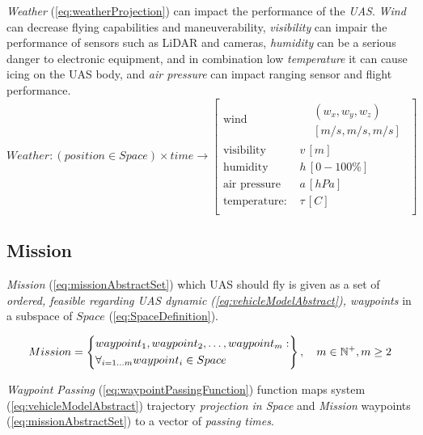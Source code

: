     \noindent\emph{Weather} (\ref{eq:weatherProjection}) can impact the performance of the \emph{UAS}. \emph{Wind} can decrease flying capabilities and maneuverability, \emph{visibility} can impair the performance of sensors such as LiDAR and cameras, \emph{humidity} can be a serious danger to electronic equipment, and in combination low \emph{temperature} it can cause icing on the UAS body, and \emph{air pressure} can impact ranging sensor and flight performance. 
    \begin{equation}\label{eq:weatherProjection}
        Weather:\left(position\in Space\right) \times time \to
        \left[
        \begin{aligned}
            \text{wind } & \begin{aligned}&(w_x,w_y,w_z)\\&[m/s,m/s,m/s]\end{aligned}\\
            \text{visibility }& v\,[m]\\
            \text{humidity }& h\,[0-100 \%] \\
            \text{air pressure }& a\,[hPa]\\
            \text{temperature: }& \tau\,[C]\\
        \end{aligned}
        \right]
    \end{equation}

\subsection{Mission}\label{s:mission}
    \noindent\emph{Mission} (\ref{eq:missionAbstractSet}) which UAS should fly is given as a set of \emph{ordered, feasible regarding UAS dynamic (\ref{eq:vehicleModelAbstract}), waypoints} in a subspace of $Space$ (\ref{eq:SpaceDefinition}).
    
    \begin{equation}\label{eq:missionAbstractSet}
        Mission = \left\{
        \begin{aligned}
            &waypoint_1, waypoint_2, \dots,waypoint_m:\\
            &\forall_{i=1\dots m} waypoint_i \in  Space
        \end{aligned}
        \right\}, \quad m\in\mathbb{N}^{+},m\ge2
    \end{equation}

    \emph{Waypoint Passing} (\ref{eq:waypointPassingFunction}) function maps system (\ref{eq:vehicleModelAbstract}) trajectory \emph{projection in Space} and \emph{Mission} waypoints (\ref{eq:missionAbstractSet}) to a vector of \emph{passing times}.
    
